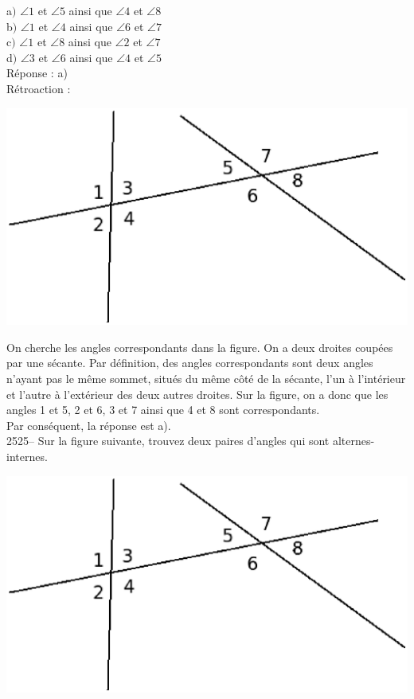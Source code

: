 \documentclass[letterpaper, 12pt]{article}
\begin{document}
a$)$ $\angle1$ et $\angle5$ ainsi que $\angle4$ et $\angle8$\\
b$)$ $\angle1$ et $\angle4$ ainsi que $\angle6$ et $\angle7$\\
c$)$ $\angle1$ et $\angle8$ ainsi que $\angle2$ et $\angle7$\\
d$)$ $\angle3$ et $\angle6$ ainsi que $\angle4$ et $\angle5$\\

R\'eponse : a)\\

R\'etroaction :\\
\begin{center}
 \includegraphics[width=8 cm,bb=0 474 591 842]{Q2524.eps}
\end{center}
On cherche les angles correspondants dans la figure. On a deux droites coup\'ees par une s\'ecante. Par d\'efinition, des angles correspondants sont deux angles n'ayant pas le m\^eme sommet, situ\'es du m\^eme c\^ot\'e de la s\'ecante, l'un \`a l'int\'erieur et l'autre \`a l'ext\'erieur des deux autres droites. Sur la figure, on a donc que les angles 1 et 5, 2 et 6, 3 et 7 ainsi que 4 et 8 sont correspondants.\\
Par cons\'equent, la r\'eponse est a).\\

2525-- Sur la figure suivante, trouvez deux paires d'angles qui sont alternes-internes.\\
\begin{center}
 \includegraphics[width=8 cm,bb=0 474 591 842]{Q2524.eps}
\end{center}
\end{document}
